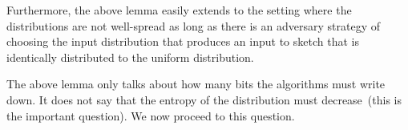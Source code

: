 \documentclass[11pt]{article}
\begin{document}
Furthermore, the above lemma easily extends to the setting where the distributions are not well-spread as long as there is an adversary strategy of choosing the input distribution that produces an input to sketch that is identically distributed to the uniform distribution.

The above lemma only talks about how many bits the algorithms must write down.  It does not say that the entropy of the distribution must decrease~(this is the important question).  We now proceed to this question.
\end{document}
